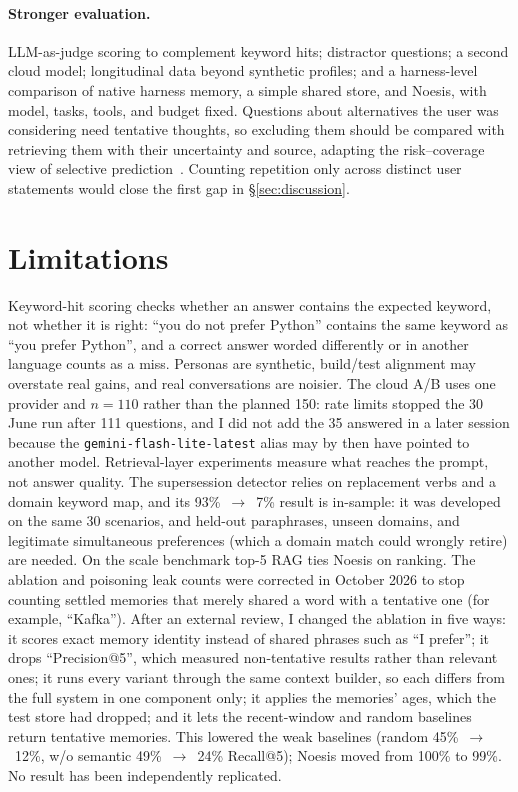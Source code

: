 \documentclass[11pt]{article}
\begin{document}
\paragraph{Stronger evaluation.} LLM-as-judge scoring to complement keyword
hits; distractor questions; a second cloud model; longitudinal data beyond
synthetic profiles; and a harness-level comparison of native harness memory, a
simple shared store, and Noesis, with model, tasks, tools, and budget fixed.
Questions about alternatives the user was considering need tentative thoughts,
so excluding them should be compared with retrieving them with their
uncertainty and source, adapting the risk--coverage view of selective
prediction~\citep{geifman2017selective}. Counting repetition only across
distinct user statements would close the first gap in \S\ref{sec:discussion}.

\section{Limitations}
\label{sec:limitations}

Keyword-hit scoring checks whether an answer contains the expected keyword,
not whether it is right: ``you do not prefer Python'' contains the same
keyword as ``you prefer Python'', and a correct answer worded differently or
in another language counts as a miss. Personas are synthetic, build/test
alignment may overstate real gains, and real conversations are noisier. The
cloud A/B uses one provider and $n{=}110$ rather than the planned 150: rate
limits stopped the 30 June run after 111 questions, and I did not add the 35
answered in a later session because the
\texttt{gemini-flash-}\allowbreak\texttt{lite-latest} alias may by then have
pointed to another model. Retrieval-layer experiments measure what reaches the
prompt, not answer quality. The supersession detector relies on replacement
verbs and a domain keyword map, and its 93\%~$\to$~7\% result is in-sample: it
was developed on the same 30 scenarios, and held-out paraphrases, unseen
domains, and legitimate simultaneous preferences (which a domain match could
wrongly retire) are needed. On the scale benchmark top-5 RAG ties Noesis on
ranking. The ablation and poisoning leak counts were corrected in October 2026
to stop counting settled memories that merely shared a word with a tentative
one (for example, ``Kafka''). After an external review, I changed the ablation
in five ways: it scores exact memory identity instead of shared phrases such
as ``I prefer''; it drops ``Precision@5'', which measured non-tentative
results rather than relevant ones; it runs every variant through the same
context builder, so each differs from the full system in one component only;
it applies the memories' ages, which the test store had dropped; and it lets
the recent-window and random baselines return tentative memories. This lowered
the weak baselines (random 45\%~$\to$~12\%, w/o semantic 49\%~$\to$~24\%
Recall@5); Noesis moved from 100\% to 99\%. No result has been independently
replicated.
\end{document}
